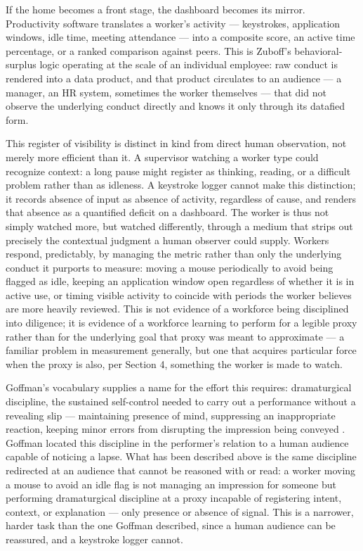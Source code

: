 \documentclass[12pt, a4paper]{article}
\begin{document}
If the home becomes a front stage, the dashboard becomes its mirror. Productivity software translates a worker's activity --- keystrokes, application windows, idle time, meeting attendance --- into a composite score, an active time percentage, or a ranked comparison against peers. This is Zuboff's behavioral-surplus logic operating at the scale of an individual employee: raw conduct is rendered into a data product, and that product circulates to an audience --- a manager, an HR system, sometimes the worker themselves --- that did not observe the underlying conduct directly and knows it only through its datafied form.

This register of visibility is distinct in kind from direct human observation, not merely more efficient than it. A supervisor watching a worker type could recognize context: a long pause might register as thinking, reading, or a difficult problem rather than as idleness. A keystroke logger cannot make this distinction; it records absence of input as absence of activity, regardless of cause, and renders that absence as a quantified deficit on a dashboard. The worker is thus not simply watched more, but watched differently, through a medium that strips out precisely the contextual judgment a human observer could supply. Workers respond, predictably, by managing the metric rather than only the underlying conduct it purports to measure: moving a mouse periodically to avoid being flagged as idle, keeping an application window open regardless of whether it is in active use, or timing visible activity to coincide with periods the worker believes are more heavily reviewed. This is not evidence of a workforce being disciplined into diligence; it is evidence of a workforce learning to perform for a legible proxy rather than for the underlying goal that proxy was meant to approximate --- a familiar problem in measurement generally, but one that acquires particular force when the proxy is also, per Section 4, something the worker is made to watch.

Goffman's vocabulary supplies a name for the effort this requires: dramaturgical discipline, the sustained self-control needed to carry out a performance without a revealing slip --- maintaining presence of mind, suppressing an inappropriate reaction, keeping minor errors from disrupting the impression being conveyed \parencite{goffman1959presentation}. Goffman located this discipline in the performer's relation to a human audience capable of noticing a lapse. What has been described above is the same discipline redirected at an audience that cannot be reasoned with or read: a worker moving a mouse to avoid an idle flag is not managing an impression for someone but performing dramaturgical discipline at a proxy incapable of registering intent, context, or explanation --- only presence or absence of signal. This is a narrower, harder task than the one Goffman described, since a human audience can be reassured, and a keystroke logger cannot.
\end{document}
